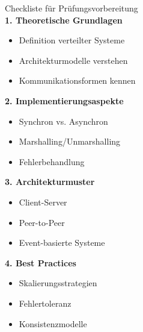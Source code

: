 \begin{KR}{Checkliste für Prüfungsvorbereitung}\\
\textbf{1. Theoretische Grundlagen}
\begin{itemize}
    \item Definition verteilter Systeme
    \item Architekturmodelle verstehen
    \item Kommunikationsformen kennen
\end{itemize}

\textbf{2. Implementierungsaspekte}
\begin{itemize}
    \item Synchron vs. Asynchron
    \item Marshalling/Unmarshalling
    \item Fehlerbehandlung
\end{itemize}

\textbf{3. Architekturmuster}
\begin{itemize}
    \item Client-Server
    \item Peer-to-Peer
    \item Event-basierte Systeme
\end{itemize}

\textbf{4. Best Practices}
\begin{itemize}
    \item Skalierungsstrategien
    \item Fehlertoleranz
    \item Konsistenzmodelle
\end{itemize}
\end{KR}